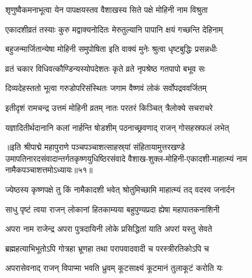 
\twolineshloka
{शृणुष्वैकमनाभूत्वा येन पापक्षयस्तव}
{वैशाखस्य सिते पक्षे मोहिनी नाम विश्रुता}%

\twolineshloka
{एकादशीव्रतं तस्याः कुरु मद्वाक्यनोदितः}
{मेरुतुल्यानि पापानि क्षयं गच्छन्ति देहिनाम्}%

\twolineshloka
{बहुजन्मार्जितान्येषा मोहिनी समुपोषिता}
{इति वाक्यं मुनेः श्रुत्वा धृष्टबुद्धिः प्रसन्नधीः}%

\twolineshloka
{व्रतं चकार विधिवत्कौण्डिन्यस्योपदेशतः}
{कृते व्रते नृपश्रेष्ठ गतपापो बभूव सः}%

\twolineshloka
{दिव्यदेहस्ततो भूत्वा गरुडोपरिसंस्थितः}
{जगाम वैष्णवं लोकं सर्वोपद्रववर्जितम्}%

\twolineshloka
{इतीदृशं रामचन्द्र उत्तमं मोहिनी व्रतम्}
{नातः परतरं किञ्चित् त्रैलोक्ये सचराचरे}%

\twolineshloka
{यज्ञादितीर्थदानानि कलां नार्हन्ति षोडशीम्}
{पठनाच्छ्रवणाद् राजन् गोसहस्रफलं लभेत्}%

॥इति श्रीपाद्मे महापुराणे पञ्चपञ्चाशत्साहस्र्यां संहितायामुत्तरखण्डे उमापतिनारदसंवादान्तर्गतकृष्णयुधिष्ठिरसंवादे वैशाख-शुक्ल-मोहिनी-एकादशी-माहात्म्यं नाम नामैकपञ्चाशत्तमोऽध्यायः॥५१॥

\genMangalaShloka

\hyperref[sec:ekadashi_mahatmyam_padma_puranam]{\closesub}
\clearpage

\label{sec:padma-jyeshtha-krishnapara}

\ganapatyadiDhyanam
\padmaPuranam



\twolineshloka
{ज्येष्ठस्य कृष्णपक्षे तु किं नामैकादशी भवेत्}
{श्रोतुमिच्छामि माहात्म्यं तद् वदस्व जनार्दन}%


\twolineshloka
{साधु पृष्टं त्वया राजन् लोकानां हितकाम्यया}
{बहुपुण्यप्रदा ह्येषा महापातकनाशिनी}%

\twolineshloka
{अपरा नाम राजेन्द्र अपरा पुत्रदायिनी}
{लोके प्रसिद्धितां याति अपरां यस्तु सेवते}%

\twolineshloka
{ब्रह्महत्याभिभूतोऽपि गोत्रहा भ्रूणहा तथा}
{परापवादवादी च परस्त्रीरतिकोऽपि च}%

\twolineshloka
{अपरासेवनाद् राजन् विपाप्मा भवति ध्रुवम्}
{कूटसाक्ष्यं कूटमानं तुलाकूटं करोति यः}%

